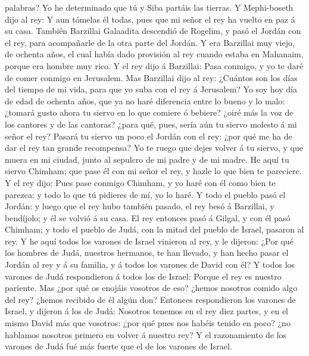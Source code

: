palabras? Yo he determinado que tú y Siba partáis las tierras.
 Y Mephi-boseth dijo al rey: Y aun tómelas él todas, pues
que mi señor el rey ha vuelto en paz á su casa.  También
Barzillai Galaadita descendió de Rogelim, y pasó el Jordán con el rey,
para acompañarle de la otra parte del Jordán.  Y era
Barzillai muy viejo, de ochenta años, el cual había dado provisión al
rey cuando estaba en Mahanaim, porque era hombre muy rico.
 Y el rey dijo á Barzillai: Pasa conmigo, y yo te daré de
comer conmigo en Jerusalem.  Mas Barzillai dijo al rey:
¿Cuántos son los días del tiempo de mi vida, para que yo suba con el rey
á Jerusalem?  Yo soy hoy día de edad de ochenta años, que
ya no haré diferencia entre lo bueno y lo malo: ¿tomará gusto ahora tu
siervo en lo que comiere ó bebiere? ¿oiré más la voz de los cantores y
de las cantoras? ¿para qué, pues, sería aún tu siervo molesto á mi señor
el rey?  Pasará tu siervo un poco el Jordán con el rey:
¿por qué me ha de dar el rey tan grande recompensa?  Yo
te ruego que dejes volver á tu siervo, y que muera en mi ciudad, junto
al sepulcro de mi padre y de mi madre. He aquí tu siervo Chimham; que
pase él con mi señor el rey, y hazle lo que bien te pareciere.
 Y el rey dijo: Pues pase conmigo Chimham, y yo haré con
él como bien te parezca: y todo lo que tú pidieres de mí, yo lo haré.
 Y todo el pueblo pasó el Jordán: y luego que el rey hubo
también pasado, el rey besó á Barzillai, y bendíjolo; y él se volvió á
su casa.  El rey entonces pasó á Gilgal, y con él pasó
Chimham; y todo el pueblo de Judá, con la mitad del pueblo de Israel,
pasaron al rey.  Y he aquí todos los varones de Israel
vinieron al rey, y le dijeron: ¿Por qué los hombres de Judá, nuestros
hermanos, te han llevado, y han hecho pasar el Jordán al rey y á su
familia, y á todos los varones de David con él?  Y todos
los varones de Judá respondieron á todos los de Israel: Porque el rey es
nuestro pariente. Mas ¿por qué os enojáis vosotros de eso? ¿hemos
nosotros comido algo del rey? ¿hemos recibido de él algún don?
 Entonces respondieron los varones de Israel, y dijeron á
los de Judá: Nosotros tenemos en el rey diez partes, y en el mismo David
más que vosotros: ¿por qué pues nos habéis tenido en poco? ¿no hablamos
nosotros primero en volver á nuestro rey? Y el razonamiento de los
varones de Judá fué más fuerte que el de los varones de Israel.


